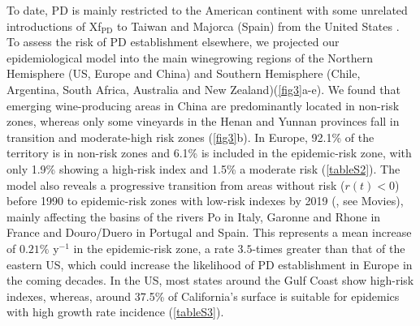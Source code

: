     To date, PD is mainly restricted to the American continent with some
    unrelated introductions of Xf$_{\textrm{PD}}$ to Taiwan and Majorca (Spain)
    from the United States \cite{Moralejo2019,Su2013}. To assess the risk of PD
    establishment elsewhere, we projected our epidemiological model into the
    main winegrowing regions of the Northern Hemisphere (US, Europe and China)
    and Southern Hemisphere (Chile, Argentina, South Africa, Australia and New
    Zealand)(\cref{fig3}a-e). We found that emerging wine-producing areas in
    China are predominantly located in non-risk zones, whereas only some
    vineyards in the Henan and Yunnan provinces fall in transition and
    moderate-high risk zones (\cref{fig3}b). In Europe, 92.1\% of the territory
    is in non-risk zones and 6.1\% is included in the epidemic-risk zone, with
    only 1.9\% showing a high-risk index and 1.5\% a moderate risk
    (\cref{tableS2}). The model also reveals a progressive transition from
    areas without risk ($r(t) < 0$) before 1990 to
    epidemic-risk zones with low-risk indexes by 2019 (\cite{Webpage}, see
    Movies), mainly affecting the basins of the rivers Po in Italy, Garonne and
    Rhone in France and Douro/Duero in Portugal and Spain. This represents a
    mean increase of $0.21\%$ y$^{-1}$ in the epidemic-risk zone, a rate
$3.5$-times greater than that of the eastern US, which could increase the
    likelihood of PD establishment in Europe in the coming decades. In the US,
    most states around the Gulf Coast show high-risk indexes, whereas, around
    37.5\% of California's surface is suitable for epidemics with high growth
    rate incidence (\cref{tableS3}).

    \begin{table}[H]
        \begin{center}
            \caption{\textbf{Validation of model predictions.} The items are
                locations
                where PD was present or absent. TP corresponds to true
                positives and TN to true
                negatives according to our model with $R_0=8$. }
            \label{tab:validation}
        \end{center}
    \end{table}

